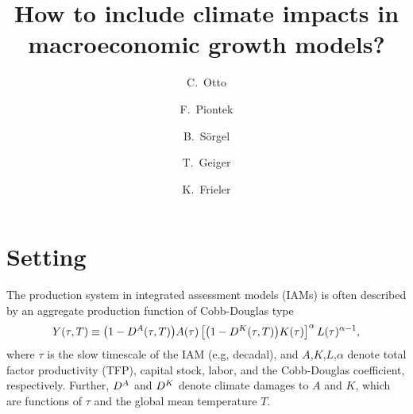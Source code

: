 \documentclass[preprint,3p,authoryear]{elsarticle}
\begin{document}

\begin{frontmatter}

  \title{How to include climate impacts in macroeconomic growth models?}

\author[PIK]{C.~Otto}


\author[PIK]{F.~Piontek}
\author[PIK]{B.~Sörgel}
\author[PIK]{T.~Geiger}
\author[PIK]{K.~Frieler}


\address[PIK]{Potsdam Institute for Climate Impact Research, Potsdam, Germany}




\end{frontmatter}



\section{Setting}
\label{sec:set}
The production system in integrated assessment models (IAMs) is often described by an aggregate production function of Cobb-Douglas type
\begin{equation}
  \label{eq:CD}
  Y(\tau,T)\equiv \big(1-D^A(\tau,T)\big)A(\tau)\left[\big(1-D^K(\tau,T)\big)K(\tau) \right]^\alpha L(\tau)^{\alpha-1},
\end{equation}
where $\tau$ is the slow timescale of the IAM (e.g, decadal), and $A$,$K$,$L$,$\alpha$ denote total factor productivity (TFP), capital stock, labor, and the Cobb-Douglas coefficient, respectively. Further, $D^A$ and $D^K$ denote climate damages to $A$ and $K$, which are functions of $\tau$ and the global mean temperature $T$.
\end{document}
